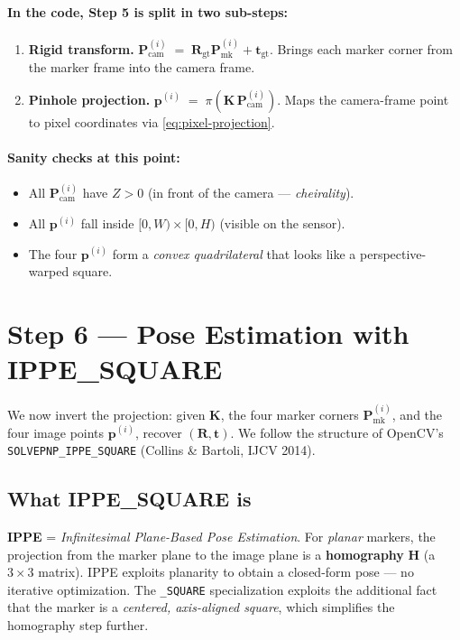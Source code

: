 \documentclass[11pt]{article}
\newcommand{\Rgt}{\mathbf{R}_{\text{gt}}}
\newcommand{\tgt}{\mathbf{t}_{\text{gt}}}
\newcommand{\Pcam}{\mathbf{P}_{\text{cam}}}
\newcommand{\Pmark}{\mathbf{P}_{\text{mk}}}
\newcommand{\KK}{\mathbf{K}}
\newcommand{\Hom}{\mathbf{H}}
\begin{document}
\paragraph{In the code, Step 5 is split in two sub-steps:}
\begin{enumerate}[label=(\alph*)]
  \item \textbf{Rigid transform.} $\Pcam^{(i)} \;=\; \Rgt \Pmark^{(i)} + \tgt$.
        Brings each marker corner from the marker frame into the camera frame.
  \item \textbf{Pinhole projection.} $\mathbf{p}^{(i)} \;=\; \pi(\KK\,\Pcam^{(i)})$.
        Maps the camera-frame point to pixel coordinates via
        \eqref{eq:pixel-projection}.
\end{enumerate}

\paragraph{Sanity checks at this point:}
\begin{itemize}[leftmargin=*]
  \item All $\Pcam^{(i)}$ have $Z > 0$ (in front of the camera --- \emph{cheirality}).
  \item All $\mathbf{p}^{(i)}$ fall inside $[0, W) \times [0, H)$ (visible on the sensor).
  \item The four $\mathbf{p}^{(i)}$ form a \emph{convex quadrilateral} that looks
        like a perspective-warped square.
\end{itemize}

\section{Step 6 --- Pose Estimation with IPPE\_SQUARE}

We now invert the projection: given $\KK$, the four marker corners
$\Pmark^{(i)}$, and the four image points $\mathbf{p}^{(i)}$, recover
$(\mathbf{R}, \mathbf{t})$. We follow the structure of OpenCV's
\verb|SOLVEPNP_IPPE_SQUARE| (Collins \& Bartoli, IJCV 2014).

\subsection{What IPPE\_SQUARE is}

\textbf{IPPE} = \emph{Infinitesimal Plane-Based Pose Estimation}.
For \emph{planar} markers, the projection from the marker plane to the
image plane is a \textbf{homography} $\Hom$ (a $3\times 3$ matrix). IPPE
exploits planarity to obtain a closed-form pose --- no iterative
optimization. The \verb|_SQUARE| specialization exploits the additional
fact that the marker is a \emph{centered, axis-aligned square}, which
simplifies the homography step further.
\end{document}
